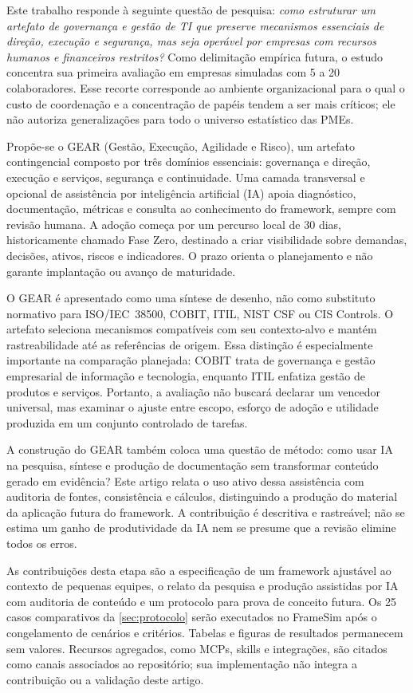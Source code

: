 Este trabalho responde à seguinte questão de pesquisa: \emph{como estruturar um artefato de governança e gestão de TI que preserve mecanismos essenciais de direção, execução e segurança, mas seja operável por empresas com recursos humanos e financeiros restritos?} Como delimitação empírica futura, o estudo concentra sua primeira avaliação em empresas simuladas com 5 a 20 colaboradores. Esse recorte corresponde ao ambiente organizacional para o qual o custo de coordenação e a concentração de papéis tendem a ser mais críticos; ele não autoriza generalizações para todo o universo estatístico das PMEs.

Propõe-se o GEAR (Gestão, Execução, Agilidade e Risco), um artefato contingencial composto por três domínios essenciais: governança e direção, execução e serviços, segurança e continuidade. Uma camada transversal e opcional de assistência por inteligência artificial (IA) apoia diagnóstico, documentação, métricas e consulta ao conhecimento do framework, sempre com revisão humana. A adoção começa por um percurso local de 30 dias, historicamente chamado Fase Zero, destinado a criar visibilidade sobre demandas, decisões, ativos, riscos e indicadores. O prazo orienta o planejamento e não garante implantação ou avanço de maturidade.

O GEAR é apresentado como uma síntese de desenho, não como substituto normativo para ISO/IEC~38500, COBIT, ITIL, NIST CSF ou CIS Controls. O artefato seleciona mecanismos compatíveis com seu contexto-alvo e mantém rastreabilidade até as referências de origem. Essa distinção é especialmente importante na comparação planejada: COBIT trata de governança e gestão empresarial de informação e tecnologia, enquanto ITIL enfatiza gestão de produtos e serviços. Portanto, a avaliação não buscará declarar um vencedor universal, mas examinar o ajuste entre escopo, esforço de adoção e utilidade produzida em um conjunto controlado de tarefas.

A construção do GEAR também coloca uma questão de método: como usar IA na pesquisa, síntese e produção de documentação sem transformar conteúdo gerado em evidência? Este artigo relata o uso ativo dessa assistência com auditoria de fontes, consistência e cálculos, distinguindo a produção do material da aplicação futura do framework. A contribuição é descritiva e rastreável; não se estima um ganho de produtividade da IA nem se presume que a revisão elimine todos os erros.

As contribuições desta etapa são a especificação de um framework ajustável ao contexto de pequenas equipes, o relato da pesquisa e produção assistidas por IA com auditoria de conteúdo e um protocolo para prova de conceito futura. Os 25 casos comparativos da \cref{sec:protocolo} serão executados no FrameSim após o congelamento de cenários e critérios. Tabelas e figuras de resultados permanecem sem valores. Recursos agregados, como MCPs, skills e integrações, são citados como canais associados ao repositório; sua implementação não integra a contribuição ou a validação deste artigo.

